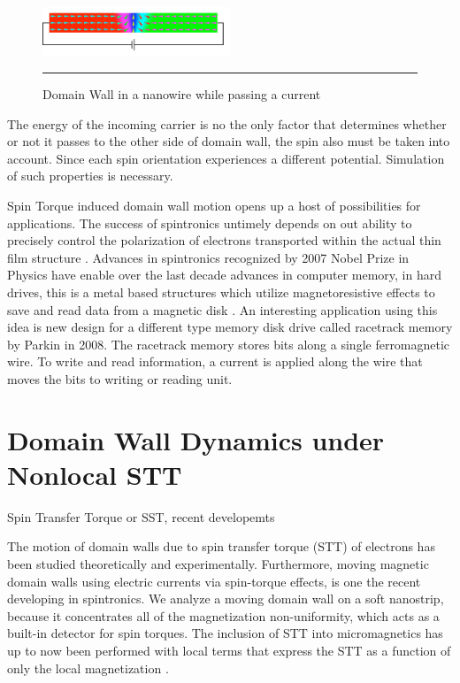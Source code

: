 \begin{figure}[htbp]
	\centering
		\includegraphics[width=0.5\textwidth]{Figures/DWspin.png}
		\rule{35em}{0.52pt}
	\caption[Domain Wall nanowire]{Domain Wall in a nanowire while passing a current}
	\label{fig:DWspin}
\end{figure}

The energy of the incoming  carrier is no the only factor that determines whether or not it passes to the other side of domain wall, the spin also must be taken into account. Since each spin orientation experiences a different potential. Simulation of such properties is necessary.

Spin Torque induced domain wall motion opens up a host of possibilities for applications. The success of spintronics untimely depends on out ability to precisely  control the polarization of electrons transported within the actual thin film structure \cite{ferro}. Advances in spintronics recognized by 2007 Nobel Prize in Physics have enable over the last decade advances in computer memory, in hard drives, this is a metal based structures which utilize magnetoresistive effects to save and read data from a magnetic disk \cite{handbookspin}. An interesting application using this idea is new design for a different type memory disk drive called racetrack memory by Parkin in 2008\cite{racetrack}. The racetrack memory stores bits along a single ferromagnetic wire. To write and read information, a current is applied along the wire that moves the bits to writing or reading unit.
 
\section{Domain Wall Dynamics under Nonlocal STT}

Spin Transfer Torque or SST, recent developemts

The motion of domain walls due to spin transfer torque (STT) of electrons has been studied theoretically and experimentally. Furthermore, moving magnetic domain walls using electric currents via spin-torque effects, is one the recent developing in spintronics. We analyze a moving domain wall on a soft nanostrip, because it concentrates all of the magnetization non-uniformity, which acts as a built-in detector for spin torques. The inclusion of STT into micromagnetics has up to now been performed with local terms that express the STT as a function of only the local magnetization \cite{claudio}.
 
